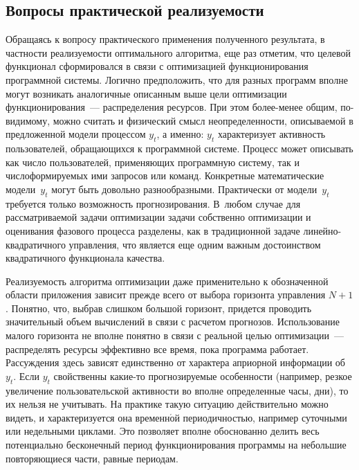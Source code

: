\begin{multicols}{2}
 \vspace*{-6pt}

\section{Вопросы практической реализуемости}

\vspace*{-2pt}

 Обращаясь к вопросу практического применения полученного результата,
в частности реализуемости оптимального алгоритма, еще раз отметим, что
целевой функционал сформировался в связи с оптимизацией
функционирования программной системы. Логично предположить, что для
разных программ вполне могут возникать аналогичные описанным выше цели
оптимизации функционирования~--- распределения ресурсов. При этом
бо\-лее-ме\-нее общим, по-ви\-ди\-мо\-му, можно считать и физический смысл
неопределенности, описываемой в предложенной модели процессом $y_t$, а
именно: $y_t$ характеризует активность пользователей, обращающихся к
программной системе. Процесс может описывать как число пользователей,
применяющих программную систему, так и число\linebreak формируемых ими запросов
или команд. Кон\-крет\-ные математические модели~$y_t$ могут быть до\-воль\-но
разнообразными. Практически от модели~$y_t$\linebreak требуется только возможность
прогнозирования.\linebreak
 В~любом случае для рассматриваемой задачи оптимиза\-ции
задачи собственно оптимизации и оценивания фазового процесса разделены,
как в традиционной задаче ли\-ней\-но-квад\-ра\-тич\-но\-го управ\-ле\-ния, что является
еще одним важным достоинством квад\-ра\-тич\-но\-го функционала качества.

 Реализуемость алгоритма оптимизации даже применительно к
обозначенной области приложения зависит прежде всего от выбора горизонта
управления $N+1$. Понятно, что, выбрав слишком большой горизонт, придется
проводить значительный объем вычислений в связи с расчетом прогнозов.
Использование малого горизонта не вполне понятно в связи с реальной целью
оптимизации~--- распределять ресурсы эффективно все время, пока программа
работает. Рассуждения здесь зависят единственно от характера априорной
информации об~$y_t$. Если $y_t$ свойственны
 ка\-кие-то прогнозируемые особенности (например, резкое увеличение
пользовательской активности во вполне определенные часы, дни), то их нельзя
не учитывать. На практике такую ситуацию действительно можно видеть, и
характеризуется она временн$\acute{\mbox{о}}$й периодичностью, например суточными или
недельными циклами. Это позволяет вполне обоснованно делить весь
потенциально бесконечный период функционирования программы на
небольшие повторяющиеся час\-ти, равные периодам.


\end{multicols}
